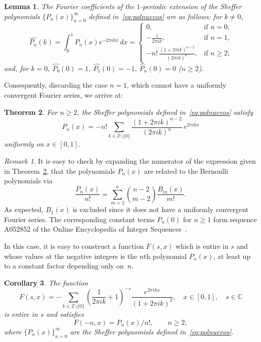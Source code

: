 \documentclass[11pt,a4paper]{amsart}
\newcommand{\Z}{\mathbb{Z}}
\newcommand{\C}{\mathbb{C}}
\theoremstyle{plain}
\newtheorem{theorem}{Theorem}
\theoremstyle{plain}
\newtheorem{corollary}[theorem]{Corollary}
\theoremstyle{plain}
\newtheorem{lemma}[theorem]{Lemma}
\theoremstyle{remark}
\newtheorem*{remark}{Remark}
\begin{document}
\begin{lemma}
\label{L:coefFouShB}
The Fourier coefficients of the $1$-periodic extension of the Sheffer polynomials $\{P_n(x)\}_{n=0}^{\infty}$ defined in~\eqref{eq:polnuevos} are as follows:
for $k\ne0$,
\[
\widehat{P_n}(k)
= \int_0^1 P_n(x) e^{-2 \pi i k x}\,dx
= \begin{cases}
    0, & \text{if $n=0$,} \\[3pt]
    -\frac{1}{2 \pi i k}, & \text{if $n=1$,} \\[3pt]
    -n! \,\frac{(1+2 \pi i k)^{n-2}}{(2 \pi i k)^n}, & \text{if $n\geq 2$;}
\end{cases}
\]
and, for $k=0$, $\widehat{P_0}(0)=1$, $\widehat{P_1}(0)=-1$, $\widehat{P_n}(0)=0$ ($n\geq 2$).
\end{lemma}

Consequently, discarding the case $n=1$, which cannot have a uniformly convergent Fourier series, we arrive at:

\begin{theorem}
\label{T:serFouB}
For $n\geq 2$, the Sheffer polynomials defined in~\eqref{eq:polnuevos} satisfy
\begin{equation*}
P_n(x) = -n! \sum_{k\in\Z\setminus\{0\}} \frac{(1+2 \pi i k)^{n-2}}{(2 \pi i k)^n} \,e^{2\pi ikx}
\end{equation*}
uniformly on $x\in[0,1]$.
\end{theorem}


\begin{remark}
It is easy to check by expanding the numerator of the expression given in Theorem~\ref{T:serFouB}, that the polynomials $P_{n}(x)$ are related to the Bernoulli polynomials via
\[
	\frac{P_{n}(x)}{n!} = \sum_{m=2}^{n} \binom{n-2}{m-2} \frac{B_{m}(x)}{m!}.
\]
As expected, $B_{1}(x)$ is excluded since it does not have a uniformly convergent Fourier series. The corresponding constant terms $P_{n}(0)$ for $n \geq 1$ form sequence A052852 of the Online Encyclopedia of Integer Sequences~\cite{OEIS-A052852}.
\end{remark}

In this case, it is easy to construct a function $F(s,x)$ which is entire in $s$ and whose values at the negative integers is the $n$th polynomial $P_{n}(x)$, at least up to a constant factor depending only on~$n$.

\begin{corollary}
The function
\[
	F(s,x) = -\sum_{k\in\Z\setminus\{0\}} \left(\frac{1}{2 \pi i k}+1\right)^{-s} \frac{e^{2 \pi i k x}}{(1+2 \pi i k)^2},
	\quad x\in [0,1],\quad s\in\C
\]
is entire in $s$ and satisfies
\[
	F(-n,x) = P_n(x)/n!,
	\qquad n \ge 2,
\]
where $\{P_n(x)\}_{n=0}^{\infty}$ are the Sheffer polynomials defined in~\eqref{eq:polnuevos}.
\end{corollary}
\end{document}

